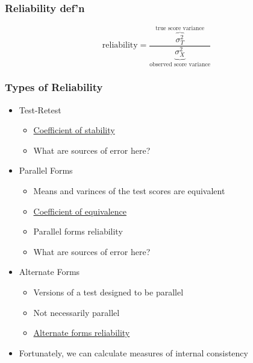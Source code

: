 \documentclass[dvipsnames]{beamer}\usepackage[]{graphicx}\usepackage[]{color}
\begin{document}
\begin{frame}
\frametitle{Reliability def'n}
$$\text{reliability} = \frac{\overbrace{\sigma^2_T}^{\text{true score variance}}}{\underbrace{\sigma^2_X}_{\text{observed score variance}}}$$
\end{frame}

\begin{frame}
\frametitle{Types of Reliability}
\begin{itemize}
\item <1->Test-Retest
  \begin{itemize}
    \item<1-> \underline{Coefficient of stability}
    \item <1->What are sources of error here?
  \end{itemize}
\item <2->Parallel Forms
  \begin{itemize}
    \item <2->Means and varinces of the test scores are equivalent
    \item <2->\underline{Coefficient of equivalence}
    \item <2->Parallel forms reliability
    \item <2->What are sources of error here?
  \end{itemize}
\item<3-> Alternate Forms 
  \begin{itemize}
    \item<3-> Versions of a test designed to be parallel
    \item<3-> Not necessarily parallel
    \item<3-> \underline{Alternate forms reliability}
  \end{itemize}
\item<4-> Fortunately, we can calculate measures of internal consistency
\end{itemize}
\end{frame}
\end{document}
